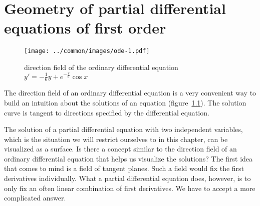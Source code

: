 %
%
%
\chapter{Geometry of partial differential equations of first order%
\label{chapter:geometry}}
\begin{figure}
\begin{center}
\texttt{[image: ../common/images/ode-1.pdf]}
\end{center}
\caption{direction field of the ordinary differential equation 
$y'=-\frac16y+e^{-\frac{x}6}\cos x$ \label{geometrie:ode}}
\end{figure}
The direction field of an ordinary differential equation is a very
convenient way to build an intuition about the solutions of an equation
(figure~\ref{geometrie:ode}).
The solution curve is tangent to directions specified by the differential
equation.


The solution of a partial differential equation with two independent
variables, which is the situation we will restrict ourselves to in
this chapter, can be visualized as a surface.
Is there a concept similar to the direction field of an ordinary
differential equation that helps us visualize the solutions?
The first idea that comes to mind is a field of tangent planes.
Such a field would fix the first derivatives individually.
What a partial differential equation does, however, is to only fix an
often linear combination of first derivatives.
We have to accept a more complicated answer.







